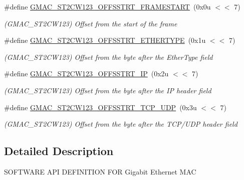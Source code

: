 \begin{DoxyCompactItemize}
\item 
\mbox{\label{group__SAME70__GMAC_ga9ae223e0b7c52583ad35f2ae9942fe6e}} 
\#define \mbox{\hyperlink{group__SAME70__GMAC_ga9ae223e0b7c52583ad35f2ae9942fe6e}{G\+M\+A\+C\+\_\+\+S\+T2\+C\+W123\+\_\+\+O\+F\+F\+S\+S\+T\+R\+T\+\_\+\+F\+R\+A\+M\+E\+S\+T\+A\+RT}}~(0x0u $<$$<$ 7)
\begin{DoxyCompactList}\small\item\em (G\+M\+A\+C\+\_\+\+S\+T2\+C\+W123) Offset from the start of the frame \end{DoxyCompactList}\item 
\mbox{\label{group__SAME70__GMAC_gaf12297b70a1840c02e924224088fcbc0}} 
\#define \mbox{\hyperlink{group__SAME70__GMAC_gaf12297b70a1840c02e924224088fcbc0}{G\+M\+A\+C\+\_\+\+S\+T2\+C\+W123\+\_\+\+O\+F\+F\+S\+S\+T\+R\+T\+\_\+\+E\+T\+H\+E\+R\+T\+Y\+PE}}~(0x1u $<$$<$ 7)
\begin{DoxyCompactList}\small\item\em (G\+M\+A\+C\+\_\+\+S\+T2\+C\+W123) Offset from the byte after the Ether\+Type field \end{DoxyCompactList}\item 
\mbox{\label{group__SAME70__GMAC_gac539682c8479eea05827ceba291014bb}} 
\#define \mbox{\hyperlink{group__SAME70__GMAC_gac539682c8479eea05827ceba291014bb}{G\+M\+A\+C\+\_\+\+S\+T2\+C\+W123\+\_\+\+O\+F\+F\+S\+S\+T\+R\+T\+\_\+\+IP}}~(0x2u $<$$<$ 7)
\begin{DoxyCompactList}\small\item\em (G\+M\+A\+C\+\_\+\+S\+T2\+C\+W123) Offset from the byte after the IP header field \end{DoxyCompactList}\item 
\mbox{\label{group__SAME70__GMAC_ga9eb6018cea2ec9165bd53bdb6e7c1398}} 
\#define \mbox{\hyperlink{group__SAME70__GMAC_ga9eb6018cea2ec9165bd53bdb6e7c1398}{G\+M\+A\+C\+\_\+\+S\+T2\+C\+W123\+\_\+\+O\+F\+F\+S\+S\+T\+R\+T\+\_\+\+T\+C\+P\+\_\+\+U\+DP}}~(0x3u $<$$<$ 7)
\begin{DoxyCompactList}\small\item\em (G\+M\+A\+C\+\_\+\+S\+T2\+C\+W123) Offset from the byte after the T\+C\+P/\+U\+DP header field \end{DoxyCompactList}\end{DoxyCompactItemize}


\subsection{Detailed Description}
S\+O\+F\+T\+W\+A\+RE A\+PI D\+E\+F\+I\+N\+I\+T\+I\+ON F\+OR Gigabit Ethernet M\+AC 